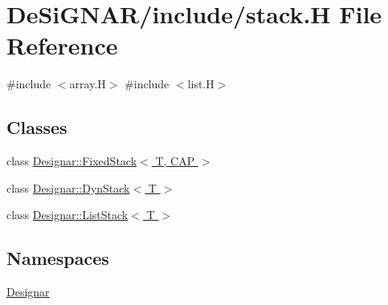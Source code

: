 \hypertarget{stack_8_h}{}\section{De\+Si\+G\+N\+A\+R/include/stack.H File Reference}
\label{stack_8_h}
{\ttfamily \#include $<$array.\+H$>$}\newline
{\ttfamily \#include $<$list.\+H$>$}\newline
\subsection*{Classes}
\begin{DoxyCompactItemize}
\item 
class \hyperlink{class_designar_1_1_fixed_stack}{Designar\+::\+Fixed\+Stack$<$ T, C\+A\+P $>$}
\item 
class \hyperlink{class_designar_1_1_dyn_stack}{Designar\+::\+Dyn\+Stack$<$ T $>$}
\item 
class \hyperlink{class_designar_1_1_list_stack}{Designar\+::\+List\+Stack$<$ T $>$}
\end{DoxyCompactItemize}
\subsection*{Namespaces}
\begin{DoxyCompactItemize}
\item 
 \hyperlink{namespace_designar}{Designar}
\end{DoxyCompactItemize}
